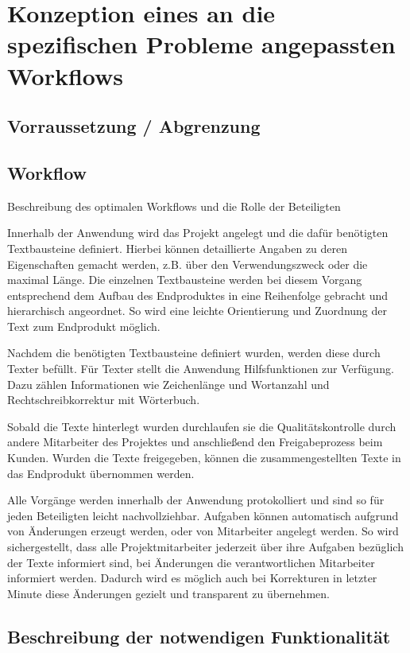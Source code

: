 \section{Konzeption eines an die spezifischen Probleme angepassten Workflows}

\subsection{Vorraussetzung / Abgrenzung}

\subsection{Workflow}

Beschreibung des optimalen Workflows und die Rolle der Beteiligten

Innerhalb der Anwendung wird das Projekt angelegt und die dafür benötigten Textbausteine definiert. Hierbei können detaillierte Angaben zu deren Eigenschaften gemacht werden, z.B. über den Verwendungszweck oder die maximal Länge. Die einzelnen Textbausteine werden bei diesem Vorgang entsprechend dem Aufbau des Endproduktes in eine Reihenfolge gebracht und hierarchisch angeordnet. So wird eine leichte Orientierung und Zuordnung der Text zum Endprodukt möglich. 

Nachdem die benötigten Textbausteine definiert wurden, werden diese durch Texter befüllt. Für Texter stellt die Anwendung Hilfsfunktionen zur Verfügung. Dazu zählen Informationen wie Zeichenlänge und Wortanzahl und Rechtschreibkorrektur mit Wörterbuch.

Sobald die Texte hinterlegt wurden durchlaufen sie die Qualitätskontrolle durch andere Mitarbeiter des Projektes und anschließend den Freigabeprozess beim Kunden. Wurden die Texte freigegeben, können die zusammengestellten Texte in das Endprodukt übernommen werden. 

Alle Vorgänge werden innerhalb der Anwendung protokolliert und sind so für jeden Beteiligten leicht nachvollziehbar. Aufgaben können automatisch aufgrund von Änderungen erzeugt werden, oder von Mitarbeiter angelegt werden. So wird sichergestellt, dass alle Projektmitarbeiter jederzeit über ihre Aufgaben bezüglich der Texte informiert sind, bei Änderungen die verantwortlichen Mitarbeiter informiert werden. Dadurch wird es möglich auch bei Korrekturen in letzter Minute diese Änderungen gezielt und transparent zu übernehmen.

\subsection{Beschreibung der notwendigen Funktionalität}

